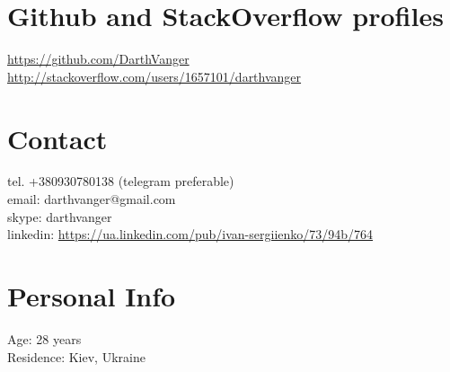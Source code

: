 \documentclass[a4paper, 14pt]{article}
\begin{document}
\section{Github and StackOverflow profiles}
  \url{https://github.com/DarthVanger} \\
  \url{http://stackoverflow.com/users/1657101/darthvanger}

\section{Contact}
	tel. +380930780138 (telegram preferable) \\
	email: darthvanger@gmail.com \\
  skype: darthvanger \\
  linkedin: \url{https://ua.linkedin.com/pub/ivan-sergiienko/73/94b/764} \\
\section{Personal Info}
	Age: 28 years \\
	Residence: Kiev, Ukraine
\end{document}

